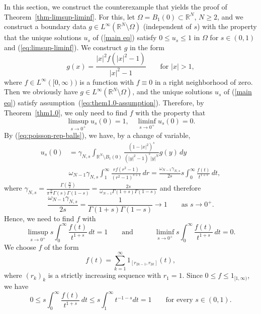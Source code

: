 \documentclass[notitlepage,11pt,reqno]{amsart}
\theoremstyle{definition}
\numberwithin{equation}{section}
\newcommand{\R}{\mathds{R}}
\newcommand{\RR}{\mathds{R}}
\begin{document}
In this section, we construct the counterexample that yields the proof of Theorem~\ref{thm-limsup-liminf}. 
For this, let $\Omega = B_1(0) \subset \R^N$, $N \ge 2$, and we construct a boundary data $g \in L^\infty(\R^N \setminus \Omega)$ (independent of $s$) with the property that the unique solutions $u_s$ of (\ref{main eq}) satisfy $0 \le u_s \le 1$ in $\Omega$ for $s \in (0,1)$ and  (\ref{eq:limsup-liminf}). We construct $g$ in the form 
$$
g(x)=\frac{|x|^2f(|x|^2-1)}{|x|^2-1}  \qquad \text{for $|x|>1$},
$$
where $f\in L^{\infty}([0,\infty))$ is a function with $f \equiv 0$ in a right neighborhood of zero. Then we obviously have $g \in L^\infty(\R^N \setminus \Omega)$, and the unique solutions $u_s$ of (\ref{main eq}) satisfy assumption~(\ref{eq:them1.0-assumption}). Therefore, by Theorem~\ref{thm1.0}, we only need to find $f$ with the property that
  \begin{equation*}
    \label{eq:limsup-liminf-0}
  \limsup_{s \to 0^+}u_s(0)=1, \quad \liminf_{s \to 0^+}u_s(0)=0. 
  \end{equation*}
By (\ref{eq:poisson-rep-balls}), we have, by a change of variable,
\begin{align*}
  u_s(0)&= \gamma_{N,s}\int_{\RR^N\setminus B_1(0)}\frac{(1-|x|^2)^s}{(|y|^2-1)^s|y|^N}g(y)\, dy\\
&\omega_{N-1}\gamma_{N,s} \int_1^{\infty}\frac{r f(r^2-1)}{(r^2-1)^{s+1}}\, dr= \frac{\omega_{N-1}\gamma_{N,s}}{2s} s \int_0^{\infty}\frac{f(t)}{t^{1+s}}\, dt,
\end{align*}
where $\gamma_{N,s}=\frac{\Gamma(\frac{N}{2})}{\pi^{\frac{N}{2}}\Gamma(s)\Gamma(1-s)} = \frac{2s}{\omega_{N-1}\Gamma(1+s)\Gamma(1-s)}$  and therefore
$$
\frac{\omega_{N-1}\gamma_{N,s}}{2s} = \frac{1}{\Gamma(1+s)\Gamma(1-s)} \to 1 \qquad \text{as $s \to 0^+$.}
$$
Hence, we need to find $f$ with
  \begin{equation}
    \label{eq:limsup-liminf-f}
  \limsup_{s \to 0^+}s \int_0^{\infty}\frac{f(t)}{t^{1+s}}\, dt =1 \qquad \text{and}\qquad  \quad \liminf_{s \to 0^+} s \int_0^{\infty}\frac{f(t)}{t^{1+s}}\, dt =0. 
  \end{equation}
We choose $f$ of the form 
\begin{equation}
  \label{eq:f-special-choice}
f(t)= \sum_{k=1}^{\infty} 1_{[r_{2k-1},r_{2k}]}(t),
\end{equation}
where $(r_k)_k$ is a strictly increasing sequence with $r_1=1$. Since $0 \le f \le 1_{[1,\infty)}$, we have
\begin{equation}
  \label{eq:bounds-f-integral}
0 \le s \int_0^{\infty}\frac{f(t)}{t^{1+s}}\, dt \le s \int_1^\infty t^{-1-s}dt = 1 \qquad \text{for every $s \in (0,1)$.}
\end{equation}
\end{document}
